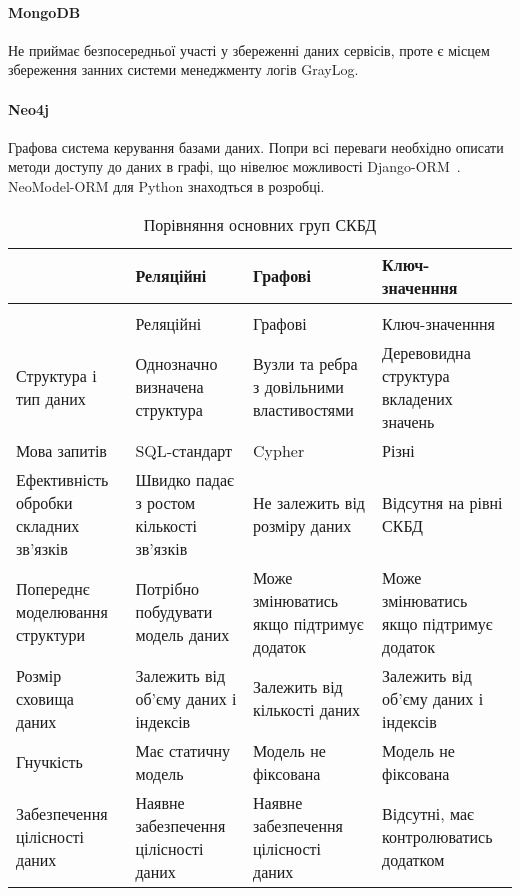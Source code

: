 \paragraph{MongoDB}
Не приймає безпосередньої участі у збереженні даних сервісів, проте є місцем збереження занних системи менеджменту логів GrayLog.

\paragraph{Neo4j} \label{neo4j}
Графова система керування базами даних. Попри всі переваги необхідно описати методи доступу до даних в графі, що нівелює можливості Django-ORM~\cite{gupta2015building}. NeoModel-ORM для Python знаходться в розробці.

\begin{longtable}{|p{3cm}|p{3.5cm}|p{3.5cm}|p{3.5cm}|}
\caption{Порівняння основних груп СКБД}
\label{tab:db_diff}\\
\hline
 &
  Реляційні &
  Графові &
  Ключ-значенння \\ \hline
\endfirsthead
\captionsetup{format=continued}%

\caption{Порівняння основних груп СКБД}
\\
\hline
 &
  Реляційні &
  Графові &
  Ключ-значенння \\ \hline
\endhead
%
Структура і тип даних &
  Однозначно визначена структура &
  Вузли та ребра з довільними властивостями &
  Деревовидна структура вкладених значень \\ \hline
Мова запитів &
  SQL-стандарт &
  Cypher &
  Різні \\ \hline
Ефективність обробки складних зв’язків &
  Швидко падає з ростом кількості зв’язків &
  Не залежить від розміру даних &
  Відсутня на рівні СКБД \\ \hline
Попереднє моделювання структури &
  Потрібно побудувати модель даних &
  Може змінюватись якщо підтримує додаток &
  Може змінюватись якщо підтримує додаток \\ \hline
Розмір сховища даних & Залежить від об'єму даних і індексів & Залежить від кількості даних & Залежить від об'єму даних і індексів \\ \hline
Гнучкість &
  Має статичну модель &
  Модель не фіксована &
  Модель не фіксована \\ \hline
Забезпечення цілісності даних &
  Наявне забезпечення цілісності даних &
  Наявне забезпечення цілісності даних &
  Відсутні, має контролюватись додатком \\ \hline
\end{longtable}

